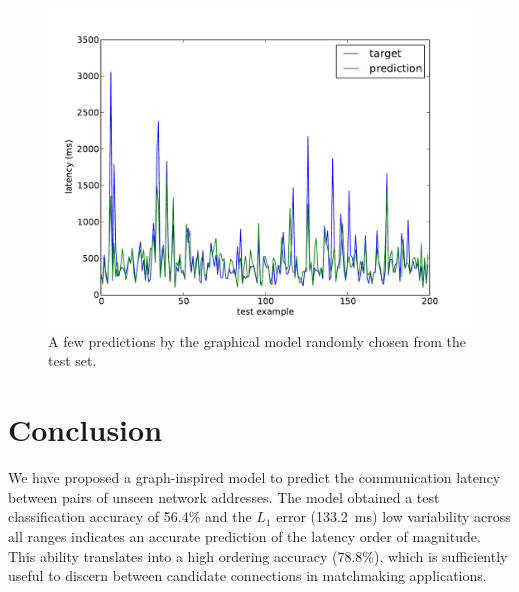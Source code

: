 \documentclass[10pt,a4paper,notitlepage,twocolumn]{article}
\begin{document}



\begin{figure}[h]
\centering
\includegraphics[width=\columnwidth]{full_samples}
\caption{A few predictions by the graphical model randomly chosen from the test set.}
\label{fig:samples}
\end{figure}


\section{Conclusion}

We have proposed a graph-inspired model to predict the communication latency between pairs of unseen network addresses.
The model obtained a test classification accuracy of 56.4\% and the $L_1$ error (133.2~ms) low variability across all ranges indicates an accurate prediction of the latency order of magnitude.
This ability translates into a high ordering accuracy (78.8\%), which is sufficiently useful to discern between candidate connections in matchmaking applications.
\end{document}
